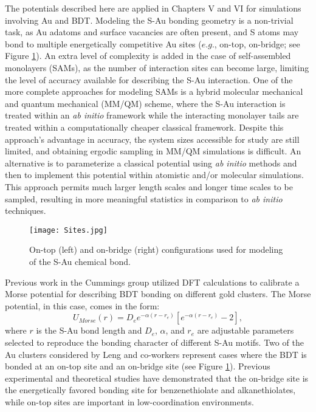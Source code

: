\documentclass[10pt]{report}  %
\newcommand\findent{\hspace*{\parindent}}
\begin{document}
\findent The potentials described here are applied in Chapters V and VI for simulations involving Au and BDT. Modeling the S-Au bonding geometry is a non-trivial task, as Au adatoms and surface vacancies are often present, and S atoms may bond to multiple energetically competitive Au sites ($e.g.$, on-top, on-bridge; see Figure \ref{fig:sites}).\cite{Nara:2004,Cossaro:2008,Hakkinen:2012}  An extra level of complexity is added in the case of self-assembled monolayers (SAMs), as the number of interaction sites can become large, limiting the level of accuracy available for describing the S-Au interaction.  One of the more complete approaches for modeling SAMs is a hybrid molecular mechanical and quantum mechanical (MM/QM) scheme, where the S-Au interaction is treated within an \emph{ab initio} framework while the interacting monolayer tails are treated within a computationally cheaper classical framework. \cite{Fischer:2003} Despite this approach's advantage in accuracy, the system sizes accessible for study are still limited, and obtaining ergodic sampling in MM/QM simulations is difficult.  An alternative is to parameterize a classical potential using \emph{ab initio} methods and then to implement this potential within atomistic and/or molecular simulations.  This approach permits much larger length scales and longer time scales to be sampled, resulting in more meaningful statistics in comparison to \emph{ab initio} techniques.  

\begin{figure}[b]
	\centering
	\texttt{[image: Sites.jpg]}
	\caption{On-top (left) and on-bridge (right) configurations used for modeling of the S-Au chemical bond. }
	\label{fig:sites}
\end{figure}

Previous work \cite{Leng:2007} in the Cummings group utilized DFT calculations to calibrate a Morse potential for describing BDT bonding on different gold clusters. The Morse potential, in this case, comes in the form:
\begin{equation}U_{Morse}(r) = D_{e}e^{-\alpha(r-r_{e})}\left[e^{-\alpha(r-r_{e})}-2\right],\label{Morse}\end{equation} where $r$ is the S-Au bond length and $D_{e}$, $\alpha$, and $r_{e}$ are adjustable parameters selected to reproduce the bonding character of different S-Au motifs.  Two of the Au clusters considered by Leng and co-workers represent cases where the BDT is bonded at an on-top site and an on-bridge site (see Figure \ref{fig:sites}). Previous experimental \cite{Wan:2000,Li:2008} and theoretical \cite{Fischer:2003,Pontes:2006,Cossaro:2008,Leng:2007} studies have demonstrated that the on-bridge site is the energetically favored bonding site for benzenethiolate \cite{Wan:2000,Pontes:2006,Leng:2007} and alkanethiolates, \cite{Fischer:2003,Cossaro:2008,Li:2008} while on-top sites are important in low-coordination environments.\cite{Li:2008}
\end{document}
